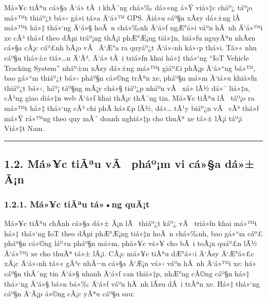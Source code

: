 \documentclass[a4paper]{extarticle}
\begin{document}
Má»¥c tiÃªu cá»§a Ä‘á» tÃ i khÃ´ng chá»‰ dá»«ng á»Ÿ viá»‡c cháº¿ táº¡o má»™t thiáº¿t bá»‹ gá»­i tá»a
Ä‘á»™ GPS. Äiá»u cáº§n xÃ¢y dá»±ng lÃ  má»™t há»‡ thá»‘ng Ä‘á»§ hoÃ n chá»‰nh Ä‘á»ƒ ngÆ°á»i váº­n
hÃ nh Ä‘á»™i xe cÃ³ thá»ƒ theo dÃµi tráº¡ng thÃ¡i phÆ°Æ¡ng tiá»‡n, hiá»ƒu nguyÃªn nhÃ¢n cá»§a
cÃ¡c cáº£nh bÃ¡o vÃ  Ä‘Æ°a ra quyáº¿t Ä‘á»‹nh ká»‹p thá»i. Tá»« nhu cáº§u thá»±c tiá»…n Ä‘Ã³, Ä‘á»
tÃ i triá»ƒn khai há»‡ thá»‘ng ``IoT Vehicle Tracking System'' nháº±m xÃ¢y dá»±ng
má»™t giáº£i phÃ¡p Ä‘á»“ng bá»™, bao gá»“m thiáº¿t bá»‹ pháº§n cá»©ng trÃªn xe, pháº§n má»m Ä‘iá»u
khiá»ƒn thiáº¿t bá»‹, háº¡ táº§ng mÃ¡y chá»§ tiáº¿p nháº­n vÃ  xá»­ lÃ½ dá»¯ liá»‡u, cÃ¹ng giao
 diá»‡n web Ä‘á»ƒ khai thÃ¡c thÃ´ng tin. Má»¥c tiÃªu lÃ  táº¡o ra má»™t há»‡ thá»‘ng cÃ³ chi
phÃ­ há»£p lÃ½, dá»… tÃ¹y biáº¿n vÃ  cÃ³ thá»ƒ má»Ÿ rá»™ng theo quy mÃ´ doanh nghiá»‡p cho
thuÃª xe tá»± lÃ¡i táº¡i Viá»‡t Nam.

\begin{center}\rule{0.5\linewidth}{0.5pt}\end{center}

\subsection{1.2. Má»¥c tiÃªu vÃ  pháº¡m vi cá»§a dá»±
Ã¡n}\label{12-mux1ee5c-tiuxeau-vuxe0-phux1ea1m-vi-cux1ee7a-dux1ef1-uxe1n}

\subsubsection{1.2.1. Má»¥c tiÃªu tá»•ng
quÃ¡t}\label{121-mux1ee5c-tiuxeau-tux1ed5ng-quuxe1t}

Má»¥c tiÃªu chÃ­nh cá»§a dá»± Ã¡n lÃ  thiáº¿t káº¿ vÃ  triá»ƒn khai má»™t há»‡ thá»‘ng IoT theo
dÃµi phÆ°Æ¡ng tiá»‡n hoÃ n chá»‰nh, bao gá»“m cáº£ pháº§n cá»©ng láº«n pháº§n má»m, phá»¥c vá»¥
cho bÃ i toÃ¡n quáº£n lÃ½ Ä‘á»™i xe cho thuÃª tá»± lÃ¡i. CÃ¡c má»¥c tiÃªu dÆ°á»›i Ä‘Ã¢y Ä‘Æ°á»£c
xÃ¡c Ä‘á»‹nh tá»« gÃ³c nhÃ¬n cá»§a Ä‘Æ¡n vá»‹ váº­n hÃ nh Ä‘á»™i xe: há» cáº§n thÃ´ng tin Ä‘á»§
nhanh Ä‘á»ƒ can thiá»‡p, nhÆ°ng cÅ©ng cáº§n há»‡ thá»‘ng Ä‘á»§ bá»n bá»‰ Ä‘á»ƒ váº­n hÃ nh lÃ¢u
dÃ i trÃªn xe. Há»‡ thá»‘ng cáº§n Ä‘Ã¡p á»©ng cÃ¡c yÃªu cáº§u sau:
\end{document}
